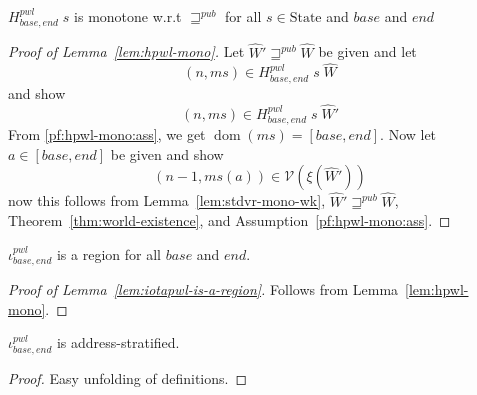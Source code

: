 \documentclass[a4paper]{article}
\DeclareMathOperator{\dom}{dom}
\newcommand{\var}[1]{\mathit{#1}}
\newcommand{\hs}{\var{ms}}
\newcommand{\ms}{\hs}
\newcommand{\addr}{\var{a}}
\newcommand{\start}{\var{base}}
\newcommand{\addrend}{\var{end}}
\newcommand{\pwl}{\var{pwl}}
\newcommand{\futurewk}{\mathbin{\sqsupseteq}^{\var{pub}}}
\newcommand{\asmType}{\plaindom{AsmType}}
\newcommand{\plaindom}[1]{\mathrm{#1}}
\newcommand{\States}{\plaindom{State}}
\newcommand{\intr}[2]{\mathcal{#1}}
\newcommand{\valueintr}[1]{\intr{V}{#1}}
\newcommand{\stdvr}{\valueintr{\asmType}}
\newcommand{\npair}[2][n]{\left(#1,#2 \right)}
\begin{document}
\begin{lemma}
  \label{lem:hpwl-mono}
  $H^\pwl_{\start,\addrend} \; s$ is monotone w.r.t $\futurewk$ for all $s \in \States$ and $\start$ and $\addrend$
\end{lemma}
\begin{proof}[Proof of Lemma~\ref{lem:hpwl-mono}]
  Let $\hat{W}' \futurewk \hat{W}$ be given and let 
  \begin{equation}
    \label{pf:hpwl-mono:ass}
    \npair{\ms} \in H^\pwl_{\start,\addrend}\; s \; \hat{W}
  \end{equation}
  and show
  \[
    \npair{\ms} \in H^\pwl_{\start,\addrend}\; s \; \hat{W}'
  \]
  From \ref{pf:hpwl-mono:ass}, we get $\dom(\ms) = [\start,\addrend]$. Now let $\addr \in [\start,\addrend]$ be given and show
  \[
    \npair[n-1]{\ms(a)} \in \stdvr(\xi(\hat{W}'))
  \]
  now this follows from Lemma~\ref{lem:stdvr-mono-wk}, $\hat{W}' \futurewk \hat{W}$, Theorem~\ref{thm:world-existence}, and Assumption~\ref{pf:hpwl-mono:ass}.
\end{proof}

\begin{lemma}
  \label{lem:iotapwl-is-a-region}
  $\iota^\pwl_{\start,\addrend}$ is a region for all $\start$ and $\addrend$.
\end{lemma}
\begin{proof}[Proof of Lemma~\ref{lem:iotapwl-is-a-region}]
  Follows from Lemma~\ref{lem:hpwl-mono}.
\end{proof}


\begin{lemma}
  \label{lem:iota-pwl-address-stratified}
  $\iota^\pwl_{\start,\addrend}$ is address-stratified.
\end{lemma}
\begin{proof}
  Easy unfolding of definitions.
\end{proof}
\end{document}
